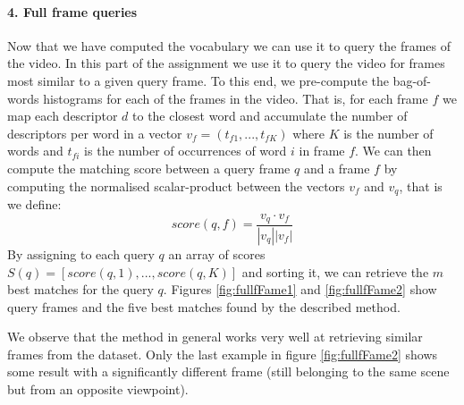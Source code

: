 \documentclass{paper}
\begin{document}
\paragraph{4. Full frame queries}
Now that we have computed the vocabulary we can use it to query the frames of the video. In this part of the assignment we use it to query the video for frames most similar to a given query frame. To this end, we pre-compute the  bag-of-words histograms for each of the frames in the video. That is, for each frame $f$ we map each descriptor $d$ to the closest word and accumulate the number of descriptors per word in a vector $v_f=(t_{f1},...,t_{fK})$ where $K$ is the number of words and $t_{fi}$ is the number of occurrences of word $i$ in frame $f$. We can then compute the matching score between a query frame $q$ and a frame $f$ by computing the normalised scalar-product between the vectors $v_f$ and $v_q$, that is we define:
\begin{equation}
score(q,f)= \frac{v_q\cdot v_f}{|v_q| | v_f|}
\end{equation}
By assigning to each query $q$ an array of scores $S(q)=[score(q,1),...,score(q,K)]$ and sorting it, we can retrieve the $m$ best matches for the query $q$. Figures \ref{fig:fullfFame1} and \ref{fig:fullfFame2} show query frames and the five best matches found by the described method.

We observe that the method in general works very well at retrieving similar frames from the dataset. Only the last example in figure \ref{fig:fullfFame2} shows some result with a  significantly different frame (still belonging to the same scene but from an opposite viewpoint). 
\end{document}
